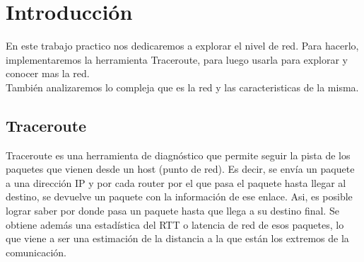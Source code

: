 \documentclass[a4paper,spanish,12pt]{article}
\begin{document}

  


    \maketitle
    
    

	\tableofcontents
	\newpage

\section{Introducción}
\indent En este trabajo practico nos dedicaremos a explorar el nivel de red. Para hacerlo, implementaremos la herramienta Traceroute, para luego usarla para explorar y conocer mas la red.\\
\indent También analizaremos lo compleja que es la red y las caracteristicas de la misma.

\subsection{Traceroute}
\indent Traceroute es una herramienta de diagnóstico que permite seguir la pista
de los paquetes que vienen desde un host (punto de red). Es decir, se envía un
paquete a una dirección IP y por cada router por el que pasa el paquete hasta
llegar al destino, se devuelve un paquete con la información de ese enlace. Asi,
es posible lograr saber por donde pasa un paquete hasta que llega a su destino
final. Se obtiene además una estadística del RTT o latencia de red de esos
paquetes, lo que viene a ser una estimación de la distancia a la que están los
extremos de la comunicación.
\end{document}
